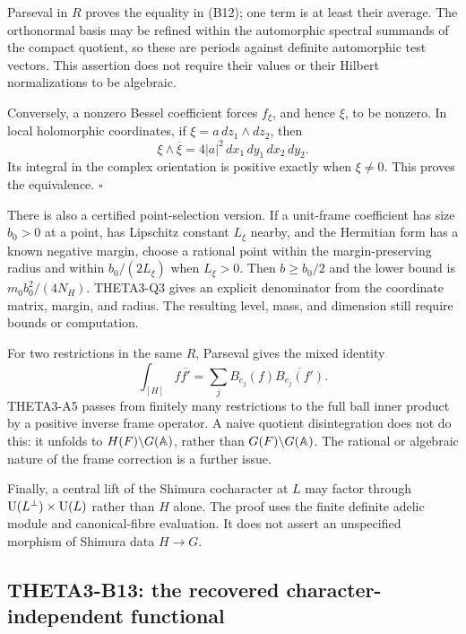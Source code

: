\documentclass[11pt]{article}
\theoremstyle{definition}\newtheorem{definition}[theorem]{Definition}\newtheorem{remark}[theorem]{Remark}
\begin{document}
Parseval in $R$ proves the equality in (B12); one term is at least their average. The orthonormal basis may be refined within the automorphic spectral summands of the compact quotient, so these are periods against definite automorphic test vectors. This assertion does not require their values or their Hilbert normalizations to be algebraic.

Conversely, a nonzero Bessel coefficient forces $f_\xi$, and hence $\xi$, to be nonzero. In local holomorphic coordinates, if $\xi=a\,dz_1\wedge dz_2$, then
\[
 \xi\wedge\overline\xi
   =4|a|^2\,dx_1\,dy_1\,dx_2\,dy_2.
\]
Its integral in the complex orientation is positive exactly when $\xi\ne0$. This proves the equivalence. \hfill$\square$

There is also a certified point-selection version. If a unit-frame coefficient has size $b_0>0$ at a point, has Lipschitz constant $L_\xi$ nearby, and the Hermitian form has a known negative margin, choose a rational point within the margin-preserving radius and within $b_0/(2L_\xi)$ when $L_\xi>0$. Then $b\geq b_0/2$ and the lower bound is $m_0b_0^2/(4N_H)$. THETA3-Q3 gives an explicit denominator from the coordinate matrix, margin, and radius. The resulting level, mass, and dimension still require bounds or computation.

For two restrictions in the same $R$, Parseval gives the mixed identity
\[
 \int_{[H]}f\overline{f'}=
 \sum_j B_{e_j}(f)\overline{B_{e_j}(f')}.
\]
THETA3-A5 passes from finitely many restrictions to the full ball inner product by a positive inverse frame operator. A naive quotient disintegration does not do this: it unfolds to $H(F)\backslash G(\mathbb A)$, rather than $G(F)\backslash G(\mathbb A)$. The rational or algebraic nature of the frame correction is a further issue.

Finally, a central lift of the Shimura cocharacter at $L$ may factor through $\operatorname{U}(L^\perp)\times\operatorname{U}(L)$ rather than $H$ alone. The proof uses the finite definite adelic module and canonical-fibre evaluation. It does not assert an unspecified morphism of Shimura data $H\to G$.

\subsection{THETA3-B13: the recovered character-independent functional}\label{B13}
\end{document}
